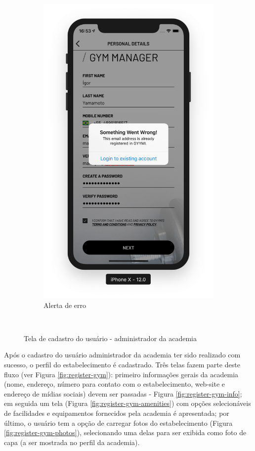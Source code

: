 \begin{figure}[h]
\begin{subfigure}[b]{0.4\textwidth}
        \includegraphics[width=\textwidth]{pfc/figuras/register-manager-error.png}
        \caption{Alerta de erro}
        \label{fig:register-manager-error}
    \end{subfigure}
    ~
    \caption{Tela de cadastro do usuário - administrador da academia}
    \label{fig:register-manager}
\end{figure}

Após o cadastro do usuário administrador da academia ter sido realizado com sucesso, o perfil do estabelecimento é cadastrado. Três telas fazem parte deste fluxo (ver Figura \ref{fig:register-gym}): primeiro informações gerais da academia (nome, endereço, número para contato com o estabelecimento, web-site e endereço de mídias sociais) devem ser passadas - Figura \ref{fig:register-gym-info}; em seguida um tela (Figura \ref{fig:register-gym-amenities}) com opções selecionáveis de facilidades e equipamentos fornecidos pela academia é apresentada; por último, o usuário tem a opção de carregar fotos do estabelecimento (Figura \ref{fig:register-gym-photos}), selecionando uma delas para ser exibida como foto de capa (a ser mostrada no perfil da academia).

